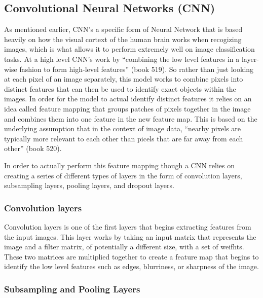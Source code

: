 \documentclass[12pt]{article}
\begin{document}
\hypertarget{convolutional-neural-networks-cnn}{%
\subsection{Convolutional Neural Networks
(CNN)}\label{convolutional-neural-networks-cnn}}

As mentioned earlier, CNN's a specific form of Neural Network that is
based heavily on how the visual cortext of the human brain works when
recogizing images, which is what allows it to perform extremely well on
image classification tasks. At a high level CNN's work by ``combining
the low level features in a layer-wise fashion to form high-level
features'' (book 519). So rather than just looking at each pixel of an
image separately, this model works to combine pixels into distinct
features that can then be used to identify exact objects within the
images. In order for the model to actual identify distinct features it
relies on an idea called feature mapping that groups patches of pixels
together in the image and combines them into one feature in the new
feature map. This is based on the underlying assumption that in the
context of image data, ``nearby pixels are typically more relevant to
each other than picels that are far away from each other'' (book 520).

In order to actually perform this feature mapping though a CNN relies on
creating a series of different types of layers in the form of
convolution layers, subsampling layers, pooling layers, and dropout
layers.

\hypertarget{convolution-layers}{%
\subsubsection{Convolution layers}\label{convolution-layers}}

Convolution layers is one of the first layers that begins extracting
features from the input images. This layer works by taking an input
matrix that represents the image and a filter matrix, of potentially a
different size, with a set of weifhts. These two matrices are multiplied
together to create a feature map that begins to identify the low level
features such as edges, blurriness, or sharpness of the image.

\hypertarget{subsampling-and-pooling-layers}{%
\subsubsection{Subsampling and Pooling
Layers}\label{subsampling-and-pooling-layers}}
\end{document}

